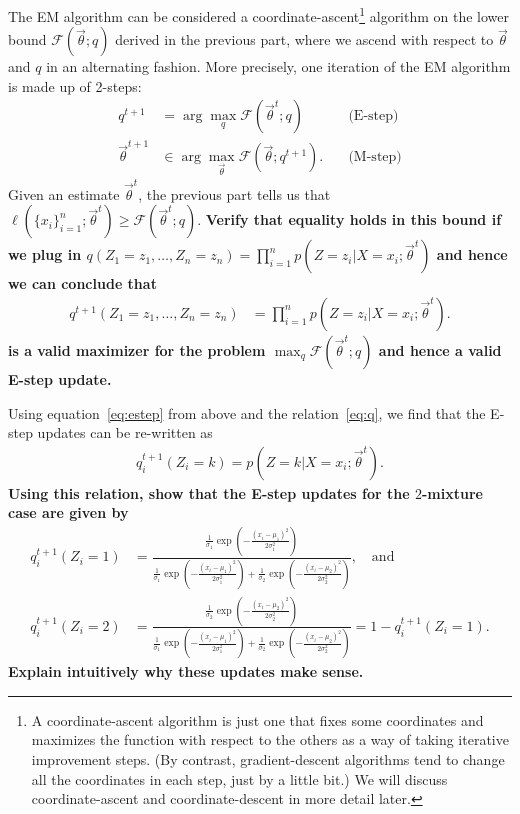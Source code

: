 \documentclass[preview]{standalone}
\begin{document}
\begin{Parts}
\Part The EM algorithm can be considered a
coordinate-ascent\footnote{A coordinate-ascent algorithm is just one
  that fixes some coordinates and maximizes the function with respect
  to the others as a way of taking iterative improvement steps. (By
  contrast, gradient-descent algorithms tend to change all the
  coordinates in each step, just by a little bit.) We
  will discuss coordinate-ascent and coordinate-descent in more detail
later. } algorithm on the
lower bound $\mathcal{F}(\vec{\theta}; q)$ derived in the previous part,
where we ascend with respect to $\vec\theta$ and $q$ in an alternating fashion.
More precisely, one iteration of the EM algorithm is made up of 2-steps:
\begin{align*}
  q^{t+1} &= \arg\max_{q} \mathcal{F}(\vec{\theta}^t; q) \quad&\text{(E-step)}\\
  {\vec{\theta}}^{t+1} &\in \arg\max_{\vec\theta} \mathcal{F}(\vec{\theta}; q^{t+1}).  \quad&\text{(M-step)}
\end{align*}
Given an estimate $\vec\theta^t$, the previous part tells us that 
$\ell(\{x_i\}_{i=1}^n; \vec{\theta}^t)  \geq 
  \mathcal{F}(\vec{\theta}^t; q)$. {\bf Verify that equality holds in
    this bound if we plug in $q(Z_1=z_1, \ldots, Z_n=z_n) 
  = \prod_{i=1}^n p(Z = z_i\vert X= x_i; \vec{\theta}^t)$
and hence we can conclude that 
\begin{align}
\label{eq:estep}
  q^{t+1}(Z_1=z_1, \ldots, Z_n=z_n) 
  &= \prod_{i=1}^n p(Z = z_i\vert X= x_i; \vec{\theta}^t).
\end{align}
is a valid maximizer for the problem $\max_{q} \mathcal{F}(\vec{\theta}^t; q)$ 
and hence a valid
E-step update.}

\Part Using equation~\eqref{eq:estep} from above and the relation~\eqref{eq:q},
we find that the E-step updates can be re-written as
\begin{align*}
  q_i^{t+1}(Z_i=k)  = p(Z = k\vert X = x_i; \vec{\theta}^t).
\end{align*}
{\bf Using this relation, show that the E-step updates for the $2$-mixture case are given by
\begin{align*}
  q_i^{t+1}(Z_i=1) &= \frac{\frac{1}{\sigma_1}\exp\left(-\frac{(x_i-\mu_1)^2}{2\sigma_1^2}\right)}{\frac{1}{\sigma_1}\exp\left(-\frac{(x_i-\mu_1)^2}{2\sigma_1^2}\right)+\frac{1}{\sigma_2}\exp\left(-\frac{(x_i-\mu_2)^2}{2\sigma_2^2}\right)}, \quad\text{and}\\
  q_i^{t+1}(Z_i=2) &=\frac{\frac{1}{\sigma_2}\exp\left(-\frac{(x_i-\mu_2)^2}{2\sigma_2^2}\right)}{\frac{1}{\sigma_1}\exp\left(-\frac{(x_i-\mu_1)^2}{2\sigma_1^2}\right)+\frac{1}{\sigma_2}\exp\left(-\frac{(x_i-\mu_2)^2}{2\sigma_2^2}\right)}=1-q_i^{t+1}(Z_i=1).
\end{align*}
Explain intuitively why these updates make sense.}


\end{Parts}
\end{document}
